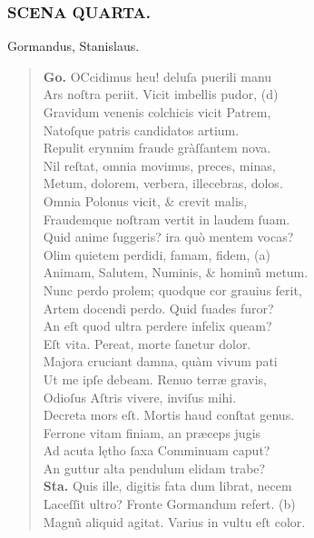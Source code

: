\documentclass[a4paper,12pt]{article}
\begin{document}
\subsubsection{SCENA QUARTA.}
\label{sec:orgd389942}
Gormandus, Stanislaus.
\begin{verse}
\textbf{Go.} OCcidimus heu! deluſa puerili manu\\[0pt]
Ars noſtra periit. Vicit imbellis pudor, (d)\footnotemark\\[0pt]
Gravidum venenis colchicis vicit Patrem,\\[0pt]
Natoſque patris candidatos artium.\\[0pt]
Repulit erynnim fraude gràſſantem nova.\\[0pt]
Nil reſtat, omnia movimus, preces, minas,\\[0pt]
Metum, dolorem, verbera, illecebras, dolos.\\[0pt]
Omnia Polonus vicit, \& crevit malis,\\[0pt]
Fraudemque noſtram vertit in laudem ſuam.\\[0pt]
Quid anime ſuggeris? ira quò mentem vocas?\\[0pt]
Olim quietem perdidi, famam, fidem, (a)\footnotemark\\[0pt]
Animam, Salutem, Numinis, \& hominũ metum.\\[0pt]
Nunc perdo prolem; quodque cor grauius ferit,\\[0pt]
Artem docendi perdo. Quid ſuades furor?\\[0pt]
An eſt quod ultra perdere infelix queam?\\[0pt]
Eſt vita. Pereat, morte ſanetur dolor.\\[0pt]
Majora cruciant damna, quàm vivum pati\\[0pt]
Ut me ipſe debeam. Renuo terræ gravis,\\[0pt]
Odioſus Aſtris vivere, inviſus mihi.\\[0pt]
Decreta mors eſt. Mortis haud conſtat genus.\\[0pt]
Ferrone vitam finiam, an præceps jugis\\[0pt]
Ad acuta lętho ſaxa Comminuam caput?\\[0pt]
An guttur alta pendulum elidam trabe?\\[0pt]
\textbf{Sta.} Quis ille, digitis fata dum librat, necem\\[0pt]
Laceſſit ultro? Fronte Gormandum refert. (b)\footnotemark\\[0pt]
Magnũ aliquid agitat. Varius in vultu eſt color.\\[0pt]

\end{verse}
\end{document}
